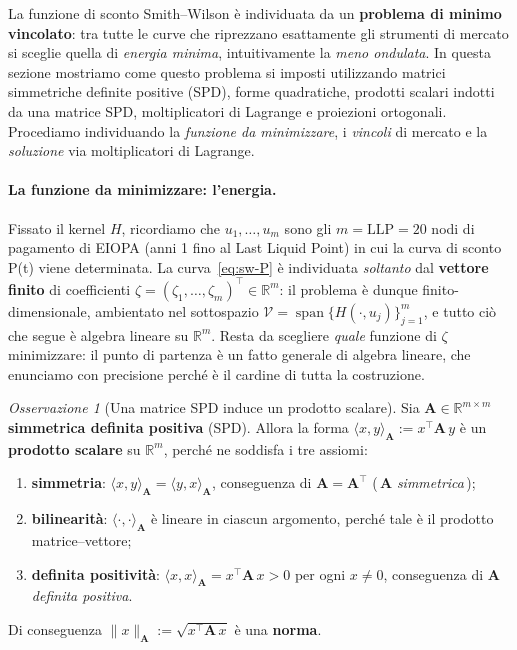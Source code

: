 \documentclass[11pt,a4paper]{article}
\theoremstyle{plain}
\theoremstyle{definition}
\theoremstyle{remark}
\newtheorem*{osservazione}{Osservazione}
\newcommand{\LLP}{\ensuremath{\mathrm{LLP}}}
\newcommand{\transp}{^{\!\top}}
\begin{document}
La funzione di sconto Smith--Wilson \`e individuata da un \textbf{problema di minimo
vincolato}: tra tutte le curve che riprezzano esattamente gli strumenti di mercato si
sceglie quella di \emph{energia minima}, intuitivamente la \emph{meno ondulata}. In questa sezione mostriamo come questo problema si imposti utilizzando matrici simmetriche definite positive
(SPD), forme quadratiche, prodotti scalari indotti da una matrice SPD, moltiplicatori di
Lagrange e proiezioni ortogonali. Procediamo individuando la \emph{funzione da minimizzare}, i \emph{vincoli} di mercato
e la \emph{soluzione} via moltiplicatori di Lagrange.

\paragraph{La funzione da minimizzare: l'energia.}
Fissato il kernel $H$, ricordiamo che $u_1,\ldots,u_m$ sono gli $m=\LLP=20$ nodi di
pagamento di EIOPA (anni 1 fino al Last Liquid Point) in cui la curva di sconto P(t) viene
determinata. La curva~\eqref{eq:sw-P} \`e individuata \emph{soltanto} dal
\textbf{vettore finito} di coefficienti $\zeta = (\zeta_1,\dots,\zeta_m)\transp \in
\mathbb{R}^m$: il problema \`e dunque finito-dimensionale, ambientato nel sottospazio
$\mathcal{V} = \operatorname{span}\{H(\cdot,u_j)\}_{j=1}^{m}$, e tutto ci\`o che segue \`e
algebra lineare su $\mathbb{R}^m$. Resta da scegliere \emph{quale} funzione di $\zeta$
minimizzare: il punto di partenza \`e un fatto generale di algebra lineare, che enunciamo con
precisione perch\'e \`e il cardine di tutta la costruzione.

\begin{osservazione}[Una matrice SPD induce un prodotto scalare]
\label{oss:spd-prodotto}
Sia $\mathbf{A}\in\mathbb{R}^{m\times m}$ \textbf{simmetrica definita positiva} (SPD).
Allora la forma $\langle x,y\rangle_{\mathbf{A}} := x\transp \mathbf{A}\, y$ \`e un
\textbf{prodotto scalare} su $\mathbb{R}^m$, perch\'e ne soddisfa i tre assiomi:
\begin{enumerate}
  \item \textbf{simmetria}: $\langle x,y\rangle_{\mathbf{A}} = \langle y,x\rangle_{\mathbf{A}}$,
        conseguenza di $\mathbf{A} = \mathbf{A}\transp$ (\,$\mathbf{A}$ \emph{simmetrica}\,);
  \item \textbf{bilinearit\`a}: $\langle \cdot,\cdot\rangle_{\mathbf{A}}$ \`e lineare in
        ciascun argomento, perch\'e tale \`e il prodotto matrice--vettore;
  \item \textbf{definita positivit\`a}: $\langle x,x\rangle_{\mathbf{A}} = x\transp\mathbf{A}\,x > 0$
        per ogni $x\neq 0$, conseguenza di $\mathbf{A}$ \emph{definita positiva}.
\end{enumerate}
Di conseguenza $\|x\|_{\mathbf{A}} := \sqrt{x\transp \mathbf{A}\, x}$ \`e una \textbf{norma}.
\end{osservazione}
\end{document}
